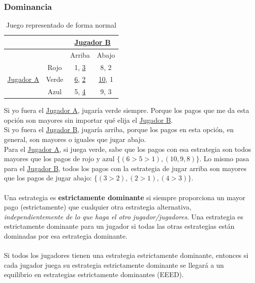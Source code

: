 \documentclass{article}
\newcommand{\ulcolor}[2][Red]{\setulcolor{#1}\ul{#2}}
\begin{document}
            \subsubsection*{Dominancia}
                \begin{table}[h]
                    \centering
                        \begin{tabular}{|c|c|c|c|}
                        \hline
                                                &               & \multicolumn{2}{c|}{\ulcolor[Blue]{Jugador B}} \\ \hline
                                                &               & Arriba & Abajo \\ \hline
                        \multirow{3}{*}{\ulcolor[Red]{Jugador A}} 
                                                & Rojo & 1, \ulcolor[blue]{3} & 8, 2 \\ \cline{2-4} 
                                                & Verde & \ulcolor[Red]{6}, \ulcolor[blue]{2} & \ulcolor[Red]{10}, 1\\\cline{2-4}
                                                & Azul & 5, \ulcolor[Blue]{4} & 9, 3\\\hline
                        \end{tabular}
                    \caption{Juego representado de forma normal}
                \end{table}
                Si yo fuera el \ulcolor[Red]{Jugador A}, jugaría verde siempre. Porque los pagos que me da esta opción son mayores sin importar qué elija el \ulcolor[Blue]{Jugador B}. \\
                Si yo fuera el \ulcolor[Blue]{Jugador B}, jugaría arriba, porque los pagos en esta opción, en general, son mayores o iguales que jugar abajo. \\
                Para el \ulcolor[Red]{Jugador A}, si juega verde, sabe que los pagos con esa estrategia son todos mayores que los pagos de rojo y azul \(\{(6 > 5 > 1), (10, 9, 8)\}\). Lo mismo pasa para el \ulcolor[Blue]{Jugador B}, todos los pagos con la estrategia de jugar arriba son mayores que los pagos de jugar abajo: \(\{(3 > 2), (2 > 1), (4 > 3)\}\). \\
                \\
                Una estrategia es \textbf{estrictamente dominante} si siempre proporciona un mayor pago (estrictamente) que cualquier otra estrategia alternativa, \emph{independientemente de lo que haga el otro jugador/jugadores}. Una estrategia es estrictamente dominante para un jugador si todas las otras estrategias están dominadas por esa estrategia dominante. \\
                \\
                Si todos los jugadores tienen una estrategia estrictamente dominante, entonces si cada jugador juega su estrategia estrictamente dominante se llegará a un equilibrio en estrategias estrictamente dominantes (EEED).
\end{document}
